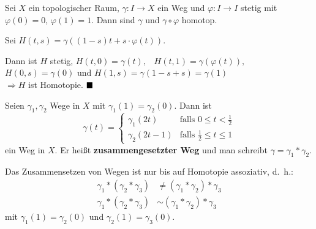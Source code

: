 \begin{bemerkung}\label{kor:homotope-wege}
    Sei $X$ ein topologischer Raum, $\gamma: I \rightarrow X$ ein 
    Weg und $\varphi: I \rightarrow I$ stetig mit $\varphi(0) = 0$,
    $\varphi(1) = 1$. Dann sind $\gamma$ und $\gamma \circ \varphi$
    homotop.
\end{bemerkung}

\begin{beweis}
    Sei $H (t,s) = \gamma ((1-s) t + s \cdot \varphi(t))$.

    Dann ist $H$ stetig, $H(t,0) = \gamma(t),\;\;\; H(t,1) = \gamma ( \varphi(t)),\;\;\;$
    $H(0,s) = \gamma(0)$ und $H(1,s) = \gamma(1-s+s) = \gamma(1)$\\
    $\Rightarrow H$ ist Homotopie. $\qed$
\end{beweis}

\begin{definition}%
    Seien $\gamma_1, \gamma_2$ Wege in $X$ mit $\gamma_1(1) = \gamma_2(0)$.
    Dann ist 
    \[\gamma (t) = \begin{cases}
        \gamma_1(2t)   &\text{falls } 0 \leq t < \frac{1}{2}\\
        \gamma_2(2t-1) &\text{falls } \frac{1}{2} \leq t \leq 1
      \end{cases}\]
    ein Weg in $X$. Er heißt \textbf{zusammengesetzter Weg} und man
    schreibt $\gamma = \gamma_1 * \gamma_2$.
\end{definition}

\begin{bemerkung}\label{kor:assoziativitaet-von-zusammensetzen-von-wegen}
    Das Zusammensetzen von Wegen ist nur bis auf 
    Homotopie assoziativ, d.~h.:
    \begin{align*}
        \gamma_1 * (\gamma_2 * \gamma_3) &\neq (\gamma_1 * \gamma_2) * \gamma_3\\
        \gamma_1 * (\gamma_2 * \gamma_3) &\sim (\gamma_1 * \gamma_2) * \gamma_3
    \end{align*}
    mit $\gamma_1(1)=\gamma_2(0)$ und $\gamma_2(1) = \gamma_3(0)$.
\end{bemerkung}

